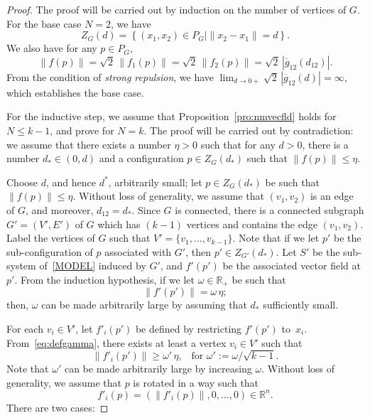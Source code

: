 \documentclass[10pt,twocolumn,twoside]{IEEEtran}
\newcommand{\R}{\mathbb{R}}
\newcommand{\ol}{\overline}
\renewcommand{\(}{\left (}
\renewcommand{\)}{\right )}
\renewcommand{\;}{\,;\,}
\begin{document}
\begin{proof}
The proof will be carried out by induction on the number of vertices of $G$. For the base case $N = 2$, we have 
$$
Z_G(d) = \left \{ (x_1, x_2) \in P_G\mid \|x_2 - x_1\| = d \right \}.
$$
We also have for any $p\in P_G$, 
$$\|f(p)\| = \sqrt{2}\, \|f_1(p)\| = \sqrt{2} \, \|f_2(p)\| = \sqrt{2}\, | \ol g_{12}(d_{12}) |.$$
From the condition of {\it strong repulsion}, we have
$
\lim_{d\to 0+}\sqrt{2}\, | \ol g_{12}(d)| = \infty
$, which establishes the base case. 

For the inductive step, we assume that Proposition~\ref{pro:nmvecfld} holds for $N \le k-1$, and prove for $N = k$. The proof will be carried out by contradiction: we assume that there exists a number $\eta > 0$ such that for any $d > 0$, there is a number $d_* \in (0, d)$ and a configuration $p\in Z_{G}\(d_*\)$ such that $\|f(p)\| \le \eta$.

Choose $d$, and hence $d^*$, arbitrarily small; let $p\in Z_G(d_*)$ be such that $ \| f(p) \| \le \eta$. Without loss of generality, we assume that $(v_1,v_2)$ is an edge of $G$, and moreover,   
$ d_{12} = d_*$.    
 Since $G$ is connected, there is a connected subgraph $G' = (V', E')$ of $G$ which has $(k - 1)$ vertices and contains the edge $(v_1,v_2)$. Label the vertices of $G$ such that $V' = \{v_1,\ldots,v_{k-1}\}$.  
Note that if we let $p'$ be the sub-configuration of $p$ associated with $G'$, then $p' \in Z_{G'}(d_*)$.  Let $S'$ be the sub-system of~\eqref{MODEL} induced by $G'$, and $f'(p')$ be the associated vector field at $p'$. From the induction hypothesis,  if we let $\omega \in \R_+$ be such that 
\begin{equation}\label{eq:defgamma}
 \| f'(p') \| = \omega\,  \eta; 
\end{equation}
then,   $\omega$ can be made arbitrarily large by assuming that $d_*$ sufficiently small. 


For each $v_i \in V'$, let $f'_i(p')$ be defined by restricting $f'(p')$ to~$x_i$. From~\eqref{eq:defgamma}, there exists at least a vertex $v_i\in V'$ such that 
$$  \|f'_i(p') \| \ge \omega' \,   \eta, \hspace{10pt} \mbox{for } \omega' := \omega/ \sqrt{k - 1}.$$
Note that $\omega'$ can be made arbitrarily large by increasing $\omega$. 
Without loss of generality, we assume that $p$ is rotated in a way such that
\begin{equation}\label{eq:assumptiononf'_i}
f'_i(p) = \(\| f'_i(p) \|, 0, \ldots, 0\) \in \R^n.
\end{equation}
There are two cases: 


\end{proof}
\end{document}
